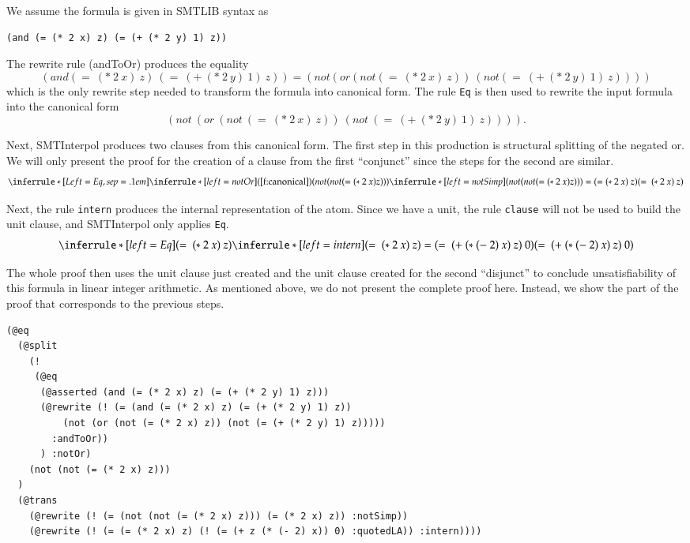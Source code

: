 \documentclass[a4paper]{article}
\newcommand\si{SMTInterpol\xspace}
\begin{document}
We assume the formula is given in SMTLIB syntax as
\begin{verbatim}
(and (= (* 2 x) z) (= (+ (* 2 y) 1) z))
\end{verbatim}

The rewrite rule (andToOr) produces the equality
\[
(and (=\ (*\ 2\ x)\ z)\ (=\ (+\ (*\ 2\ y)\ 1)\ z)) =
(not (or (not (=\ (*\ 2\ x)\ z))\ (not (=\ (+\ (*\ 2\ y)\ 1)\ z))))
\]
which is the only rewrite step needed to transform the formula into canonical
form.  The rule \texttt{Eq} is then used to rewrite the input formula
into the canonical form
\[
(not\ (or\ (not\ (=\ (*\ 2\ x)\ z))\ (not\ (=\ (+\ (*\ 2\ y)\ 1)\ z))))\tag{canonical}\label{f:canonical}.
\]

Next, \si produces two clauses from this canonical form.  The first step in
this production is structural splitting of the negated or.  We will only
present the proof for the creation of a clause from the first ``conjunct''
since the steps for the second are similar.
\[
\inferrule*[Left=Eq,sep=.1em]{
  \inferrule*[left=notOr]{(\ref{f:canonical})}{(not (not (= (*\ 2\ x) z)))}\\
  \inferrule*[left=notSimp]{ }{(not (not (= (*\ 2\ x) z))) =
    (= (*\ 2\ x)\ z)}}
           {(=\ (*\ 2\ x)\ z)}
\]

Next, the rule \texttt{intern} produces the internal representation of the
atom.  Since we have a unit, the rule \texttt{clause} will not be used to
build the unit clause, and \si only applies \texttt{Eq}.
\[
\inferrule*[left=Eq]{(=\ (*\ 2\ x)\ z) \\
  \inferrule*[left=intern]{ }{(=\ (*\ 2\ x)\ z) = (=\ (+\ (*\ (-\ 2)\ x)\ z)\
    0)}}
           {(=\ (+\ (*\ (-\ 2)\ x)\ z)\ 0)}
\]

The whole proof then uses the unit clause just created and the unit clause
created for the second ``disjunct'' to conclude unsatisfiability of this
formula in linear integer arithmetic.  As mentioned above, we do not present
the complete proof here.  Instead, we show the part of the proof that
corresponds to the previous steps.
\begin{verbatim}
(@eq
  (@split
    (!
     (@eq
      (@asserted (and (= (* 2 x) z) (= (+ (* 2 y) 1) z)))
      (@rewrite (! (= (and (= (* 2 x) z) (= (+ (* 2 y) 1) z))
          (not (or (not (= (* 2 x) z)) (not (= (+ (* 2 y) 1) z)))))
        :andToOr))
      ) :notOr)
    (not (not (= (* 2 x) z)))
  )
  (@trans
    (@rewrite (! (= (not (not (= (* 2 x) z))) (= (* 2 x) z)) :notSimp))
    (@rewrite (! (= (= (* 2 x) z) (! (= (+ z (* (- 2) x)) 0) :quotedLA)) :intern))))
\end{verbatim}
\end{document}
